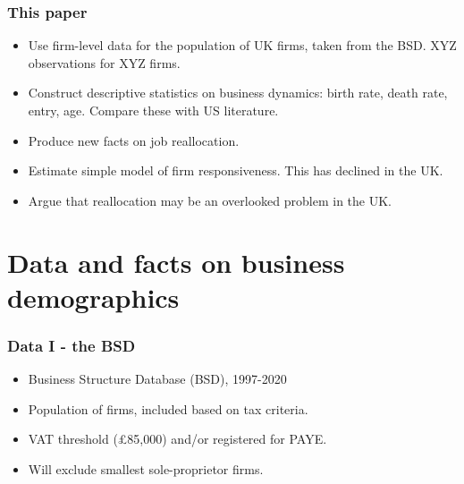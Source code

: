 \documentclass{beamer}
\begin{document}
\begin{frame}
\frametitle{This paper}

\begin{itemize}
    \item Use firm-level data for the population of UK firms, taken from the BSD. XYZ observations for XYZ firms. 
    \item Construct descriptive statistics on business dynamics: birth rate, death rate, entry, age. Compare these with US literature.  
    \item Produce new facts on job reallocation. 
    \item Estimate simple model of firm responsiveness. This has declined in the UK. 
    \item Argue that reallocation may be an overlooked problem in the UK.
\end{itemize}

\end{frame}



\section{Data and facts on business demographics}


\begin{frame}
\frametitle{Data I - the BSD}

\begin{itemize}
    \item Business Structure Database (BSD), 1997-2020
    \item Population of firms, included based on tax criteria.
    \item VAT threshold (£85,000) and/or registered for PAYE.
    \item Will exclude smallest sole-proprietor firms.
    
\end{itemize}

\end{frame}
\end{document}
